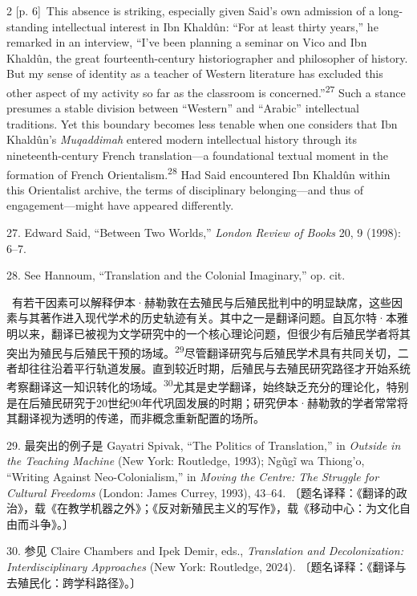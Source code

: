 \documentclass[10pt,a4paper]{article}
\begin{document}
\begin{paracol}{2}
{\scriptsize\color{gray} [p. 6]}\ This absence is striking, especially given Said’s own admission of a long-standing intellectual interest in Ibn Khaldûn: “For at least thirty years,” he remarked in an interview, “I’ve been planning a seminar on Vico and Ibn Khaldûn, the great fourteenth-century historiographer and philosopher of history. But my sense of identity as a teacher of Western literature has excluded this other aspect of my activity so far as the classroom is concerned.”\nobreak\textsuperscript{27} Such a stance presumes a stable division between “Western” and “Arabic” intellectual traditions. Yet this boundary becomes less tenable when one considers that Ibn Khaldûn’s \textit{Muqaddimah} entered modern intellectual history through its nineteenth-century French translation—a foundational textual moment in the formation of French Orientalism.\nobreak\textsuperscript{28} Had Said encountered Ibn Khaldûn within this Orientalist archive, the terms of disciplinary belonging—and thus of engagement—might have appeared differently.\par{\small 27. Edward Said, “Between Two Worlds,” \textit{London Review of Books} 20, 9 (1998): 6–7.\par}{\small 28. See Hannoum, “Translation and the Colonial Imaginary,” op. cit.\par}
\switchcolumn*
{\scriptsize\color{gray} [p. 6]}\ 有若干因素可以解释伊本·赫勒敦在去殖民与后殖民批判中的明显缺席，这些因素与其著作进入现代学术的历史轨迹有关。其中之一是翻译问题。自瓦尔特·本雅明以来，翻译已被视为文学研究中的一个核心理论问题，但很少有后殖民学者将其突出为殖民与后殖民干预的场\mbox{域。\textsuperscript{29}}尽管翻译研究与后殖民学术具有共同关切，二者却往往沿着平行轨道发展。直到较近时期，后殖民与去殖民研究路径才开始系统考察翻译这一知识转化的场\mbox{域。\textsuperscript{30}}尤其是史学翻译，始终缺乏充分的理论化，特别是在后殖民研究于20世纪90年代巩固发展的时期；研究伊本·赫勒敦的学者常常将其翻译视为透明的传递，而非概念重新配置的场所。\par{\small 29. 最突出的例子是 Gayatri Spivak, “The Politics of Translation,” in \textit{Outside in the Teaching Machine} (New York: Routledge, 1993); Ngũgĩ wa Thiong’o, “Writing Against Neo-Colonialism,” in \textit{Moving the Centre: The Struggle for Cultural Freedoms} (London: James Currey, 1993), 43–64. 〔题名译释：《翻译的政治》，载《在教学机器之外》；《反对新殖民主义的写作》，载《移动中心：为文化自由而斗争》。〕\par}{\small 30. 参见 Claire Chambers and Ipek Demir, eds., \textit{Translation and Decolonization: Interdisciplinary Approaches} (New York: Routledge, 2024). 〔题名译释：《翻译与去殖民化：跨学科路径》。〕\par}

\end{paracol}
\end{document}
